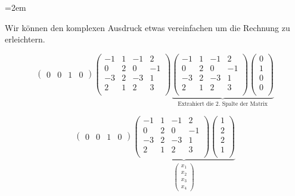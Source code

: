 \begin{solution}    

    \vspace{1\baselineskip}

    \leftskip=2em

    Wir können den komplexen Ausdruck etwas vereinfachen um die Rechnung zu erleichtern.

    \begin{equation*}    
        \begin{pmatrix}
        0 & 0 & 1 & 0
        \end{pmatrix}
        \begin{pmatrix}
        -1 & 1 & -1 & 2 \\
        0 & 2 & 0 & -1 \\
        -3 & 2 & -3 & 1 \\
        2 & 1 & 2 & 3 \\
        \end{pmatrix}
        \underbrace{
        \begin{pmatrix}
        -1 & 1 & -1 & 2 \\
        0 & 2 & 0 & -1 \\
        -3 & 2 & -3 & 1 \\
        2 & 1 & 2 & 3 \\
        \end{pmatrix}
        \begin{pmatrix}
        0\\
        1\\
        0\\
        0\\
        \end{pmatrix}}_{\text{Extrahiert die 2. Spalte der Matrix}}
    \end{equation*}

    \vspace{1\baselineskip}

    \begin{equation*}    
        \begin{pmatrix}
        0 & 0 & 1 & 0
        \end{pmatrix}
        \underbrace{
        \begin{pmatrix}
        -1 & 1 & -1 & 2 \\
        0 & 2 & 0 & -1 \\
        -3 & 2 & -3 & 1 \\
        2 & 1 & 2 & 3 \\
        \end{pmatrix}
        \begin{pmatrix}
            1 \\
            2 \\
            2 \\ 
            1 \\
        \end{pmatrix}}_{\begin{pmatrix} x_1 \\ x_2 \\ x_3 \\ x_4 \end{pmatrix}}
    \end{equation*}


\end{solution}
